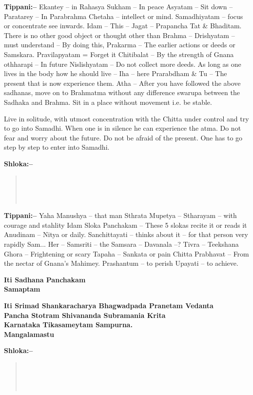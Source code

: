 \textbf{Tippani:–} Ekantey – in Rahasya Sukham – In peace Asyatam – Sit down – Paratarey – In Parabrahma Chetaha – intellect or mind. Samadhiyatam – focus or concentrate see inwards. Idam – This – Jagat – Prapancha Tat \& Bhaditam. There is no other good object or thought other than Brahma – Drishyatam – must understand – By doing this, Prakarma – The earlier actions or deeds or Samskara. Pravilapyatam = Forget it Chitibalat – By the strength of Gnana othharapi – In future Nislishyatam – Do not collect more deeds. As long as one lives in the body how he should live – Iha – here Prarabdham \& Tu – The present that is now experience them. Atha – After you have followed the above sadhanas, move on to Brahmatma without any difference swarupa between the Sadhaka and Brahma. Sit in a place without movement i.e. be stable.

Live in solitude, with utmost concentration with the Chitta under control and try to go into Samadhi. When one is in silence he can experience the atma. Do not fear and worry about the future. Do not be afraid of the present. One has to go step by step to enter into Samadhi.

\textbf{Shloka:–}

\begin{verse}
 \\\\\\
\end{verse}

\textbf{Tippani:–} Yaha Manushya – that man Sthrata Mupetya – Stharayam – with courage and stahlity Idam Sloka Panchakam – These 5 slokas recite it or reads it Anudinam – Nitya or daily. Sanchittayati – thinks about it – for that person very rapidly Sam... Her – Samsriti – the Samsara – Davanala –? Tivra – Teekshana Ghora – Frightening or scary Tapaha – Sankata or pain Chitta Prabhavat – From the nectar of Gnana's Mahimey. Prashantum – to perish Upayati – to achieve.

\begin{center}
\textbf{Iti Sadhana Panchakam\\ Samaptam}
\end{center}

\begin{center}
\textbf{Iti Srimad Shankaracharya Bhagwadpada Pranetam Vedanta\\ Pancha Stotram Shivananda Subramania Krita\\ Karnataka Tikasameytam Sampurna.\\ Mangalamastu}
\end{center}

\textbf{Shloka:–}

\begin{verse}
 \\\\\\
\end{verse}

